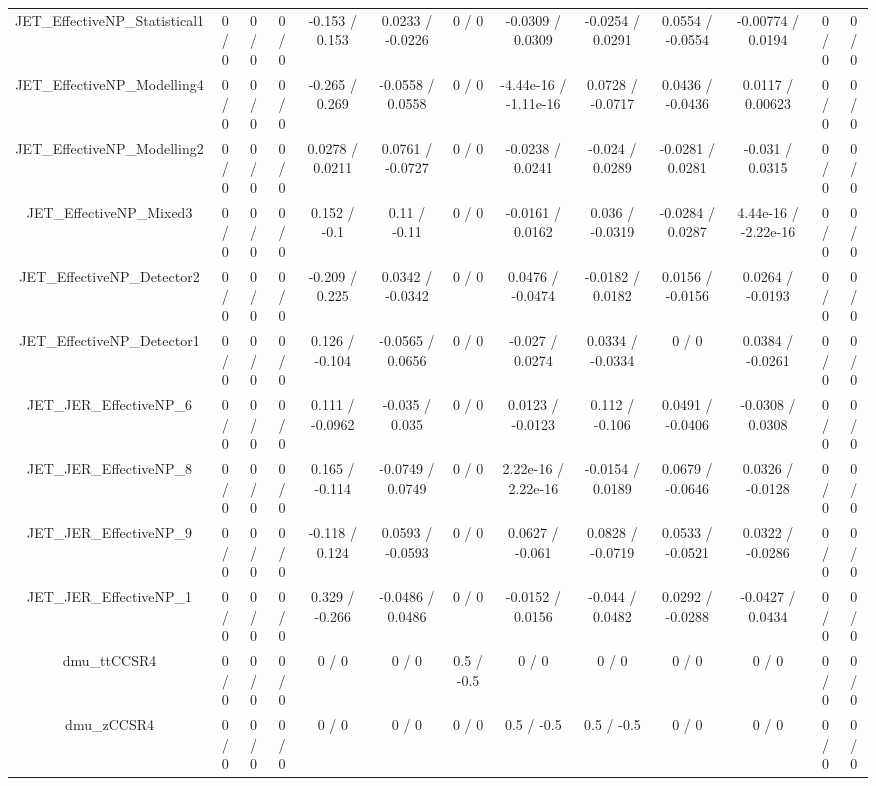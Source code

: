 \documentclass[10pt]{article}
\begin{document}
\begin{table}[htbp]
\begin{center}
\begin{tabular}{|c|c|c|c|c|c|c|c|c|c|c|c|c|}
  JET_EffectiveNP_Statistical1 & 0 / 0 & 0 / 0 & 0 / 0 & -0.153 / 0.153 & 0.0233 / -0.0226 & 0 / 0 & -0.0309 / 0.0309 & -0.0254 / 0.0291 & 0.0554 / -0.0554 & -0.00774 / 0.0194 & 0 / 0 & 0 / 0 \\ 
  JET_EffectiveNP_Modelling4 & 0 / 0 & 0 / 0 & 0 / 0 & -0.265 / 0.269 & -0.0558 / 0.0558 & 0 / 0 & -4.44e-16 / -1.11e-16 & 0.0728 / -0.0717 & 0.0436 / -0.0436 & 0.0117 / 0.00623 & 0 / 0 & 0 / 0 \\ 
  JET_EffectiveNP_Modelling2 & 0 / 0 & 0 / 0 & 0 / 0 & 0.0278 / 0.0211 & 0.0761 / -0.0727 & 0 / 0 & -0.0238 / 0.0241 & -0.024 / 0.0289 & -0.0281 / 0.0281 & -0.031 / 0.0315 & 0 / 0 & 0 / 0 \\ 
  JET_EffectiveNP_Mixed3 & 0 / 0 & 0 / 0 & 0 / 0 & 0.152 / -0.1 & 0.11 / -0.11 & 0 / 0 & -0.0161 / 0.0162 & 0.036 / -0.0319 & -0.0284 / 0.0287 & 4.44e-16 / -2.22e-16 & 0 / 0 & 0 / 0 \\ 
  JET_EffectiveNP_Detector2 & 0 / 0 & 0 / 0 & 0 / 0 & -0.209 / 0.225 & 0.0342 / -0.0342 & 0 / 0 & 0.0476 / -0.0474 & -0.0182 / 0.0182 & 0.0156 / -0.0156 & 0.0264 / -0.0193 & 0 / 0 & 0 / 0 \\ 
  JET_EffectiveNP_Detector1 & 0 / 0 & 0 / 0 & 0 / 0 & 0.126 / -0.104 & -0.0565 / 0.0656 & 0 / 0 & -0.027 / 0.0274 & 0.0334 / -0.0334 & 0 / 0 & 0.0384 / -0.0261 & 0 / 0 & 0 / 0 \\ 
  JET_JER_EffectiveNP_6 & 0 / 0 & 0 / 0 & 0 / 0 & 0.111 / -0.0962 & -0.035 / 0.035 & 0 / 0 & 0.0123 / -0.0123 & 0.112 / -0.106 & 0.0491 / -0.0406 & -0.0308 / 0.0308 & 0 / 0 & 0 / 0 \\ 
  JET_JER_EffectiveNP_8 & 0 / 0 & 0 / 0 & 0 / 0 & 0.165 / -0.114 & -0.0749 / 0.0749 & 0 / 0 & 2.22e-16 / 2.22e-16 & -0.0154 / 0.0189 & 0.0679 / -0.0646 & 0.0326 / -0.0128 & 0 / 0 & 0 / 0 \\ 
  JET_JER_EffectiveNP_9 & 0 / 0 & 0 / 0 & 0 / 0 & -0.118 / 0.124 & 0.0593 / -0.0593 & 0 / 0 & 0.0627 / -0.061 & 0.0828 / -0.0719 & 0.0533 / -0.0521 & 0.0322 / -0.0286 & 0 / 0 & 0 / 0 \\ 
  JET_JER_EffectiveNP_1 & 0 / 0 & 0 / 0 & 0 / 0 & 0.329 / -0.266 & -0.0486 / 0.0486 & 0 / 0 & -0.0152 / 0.0156 & -0.044 / 0.0482 & 0.0292 / -0.0288 & -0.0427 / 0.0434 & 0 / 0 & 0 / 0 \\ 
  dmu_ttCCSR4 & 0 / 0 & 0 / 0 & 0 / 0 & 0 / 0 & 0 / 0 & 0.5 / -0.5 & 0 / 0 & 0 / 0 & 0 / 0 & 0 / 0 & 0 / 0 & 0 / 0 \\ 
  dmu_zCCSR4 & 0 / 0 & 0 / 0 & 0 / 0 & 0 / 0 & 0 / 0 & 0 / 0 & 0.5 / -0.5 & 0.5 / -0.5 & 0 / 0 & 0 / 0 & 0 / 0 & 0 / 0 \\ 

\end{tabular}
\end{center}
\end{table}
\end{document}
